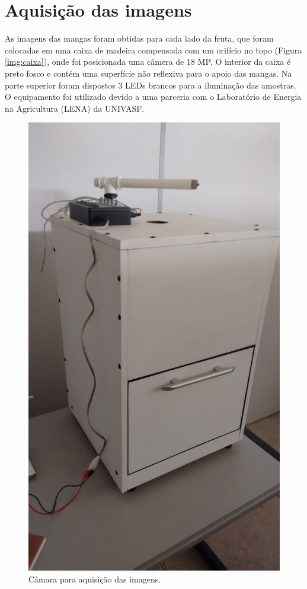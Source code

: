\section{Aquisição das imagens}

As imagens das mangas foram obtidas para cada lado da fruta, que foram colocadas em uma caixa de madeira compensada com um orifício no topo (Figura \ref{img:caixa}), onde foi posicionada uma câmera de 18 MP. O interior da caixa é preto fosco e contém uma superfície não reflexiva para o apoio das mangas. Na parte superior foram dispostos 3 LEDs brancos para a iluminação das amostras. O equipamento foi utilizado devido a uma parceria com o Laboratório de Energia na Agricultura (LENA) da UNIVASF.

\begin{figure}[H]
\centering
	\caption{Câmara para aquisição das imagens.}
	\includegraphics[scale=0.1]{img/caixa.jpg}
\end{figure}

